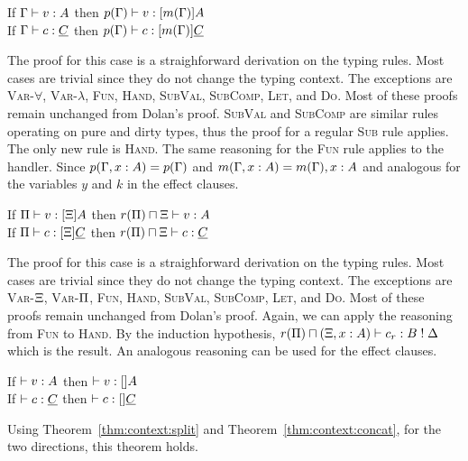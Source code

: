 \begin{theorem}
\label{thm:context:split}
If $\Gamma \vdash v \mathrel{:} A$ then $p(\Gamma) \vdash v \mathrel{:} [m(\Gamma)]A$ \\
If $\Gamma \vdash c \mathrel{:} \underline{C}$ then $p(\Gamma) \vdash c \mathrel{:} [m(\Gamma)]\underline{C}$ 
\end{theorem}
The proof for this case is a straighforward derivation on the typing rules. Most cases are trivial since they do not change the typing context. The exceptions are \textsc{Var-$\forall$}, \textsc{Var-$\lambda$}, \textsc{Fun}, \textsc{Hand}, \textsc{SubVal}, \textsc{SubComp}, \textsc{Let}, and \textsc{Do}. Most of these proofs remain unchanged from Dolan's proof. \textsc{SubVal} and \textsc{SubComp} are similar rules operating on pure and dirty types, thus the proof for a regular \textsc{Sub} rule applies. The only new rule is \textsc{Hand}. The same reasoning for the \textsc{Fun} rule applies to the handler. Since $p(\Gamma, x \mathrel{:} A) = p(\Gamma)$ and $m(\Gamma, x \mathrel{:} A) = m(\Gamma), x \mathrel{:} A$ and analogous for the variables $y$ and $k$ in the effect clauses. 

\begin{theorem}
\label{thm:context:concat}
If $\Pi \vdash v \mathrel{:} [\Xi]A$ then $r(\Pi) \sqcap \Xi \vdash v \mathrel{:} A$ \\
If $\Pi \vdash c \mathrel{:} [\Xi]\underline{C}$ then $r(\Pi) \sqcap \Xi \vdash c \mathrel{:} \underline{C}$ 
\end{theorem}
The proof for this case is a straighforward derivation on the typing rules. Most cases are trivial since they do not change the typing context. The exceptions are \textsc{Var-$\Xi$}, \textsc{Var-$\Pi$}, \textsc{Fun}, \textsc{Hand}, \textsc{SubVal}, \textsc{SubComp}, \textsc{Let}, and \textsc{Do}. Most of these proofs remain unchanged from Dolan's proof. Again, we can apply the reasoning from \textsc{Fun} to \textsc{Hand}. By the induction hypothesis, $r(\Pi) \sqcap (\Xi, x : A) \vdash c_r \mathrel{:} B \mathrel{!} \Delta$ which is the result. An analogous reasoning can be used for the effect clauses.

\begin{theorem}
\label{thm:context:empty}
If $\vdash v \mathrel{:} A$ then $\vdash v \mathrel{:} []A$ \\
If $\vdash c \mathrel{:} \underline{C}$ then $\vdash c \mathrel{:} []\underline{C}$ 
\end{theorem}
Using Theorem~\ref{thm:context:split} and Theorem~\ref{thm:context:concat}, for the two directions, this theorem holds.